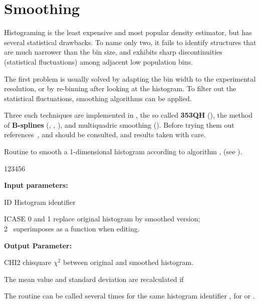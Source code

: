 
\section{Smoothing}
\label{HSMOOTH}
 
Histograming is the least expensive and most popular density
estimator, but has several statistical drawbacks.
To name only two, it
fails to identify structures that are much narrower than the bin size,
and exhibits sharp discontinuities (statistical fluctuations) among
adjacent low population bins.
 
The first problem is usually solved by adapting the bin width to the
experimental resolution, or by re-binning after looking at the histogram.
To filter out the statistical fluctuations, smoothing algorithms can be
applied.
 
Three such techniques are implemented in , the so called
{\bf 353QH} (), the method of {\bf B-splines}%
(, , ), and multiquadric
smoothing ().
Before trying them out 
references~\cite{bib-DATA,bib-SPLINE,bib-LISS,bib-Allison2},
and \cite{bib-Allison2} should be consulted, and results taken with care.
 
 
\Action
Routine to smooth a 1-dimensional histogram according to algorithm ,
 (see \cite{bib-DATA}).

\begin{DLtt}{123456}
\item[{\rm\bf Input parameters:}]
\item[ID] Histogram identifier
\item[ICASE] 0 and 1 replace original histogram by smoothed version;\\
2 \ superimposes as a function when editing.
\item[{\rm\bf Output Parameter:}]
\item[CHI2] chisquare $\chi^2$ between original and smoothed histogram.
\end{DLtt}
 
\Remark
\begin{UL}
\item The mean value and standard deviation are recalculated if 
\item The routine can be called several times for the same histogram identifier
, for  or .
\end{UL}
 
